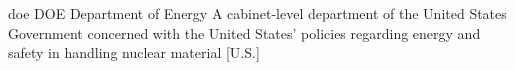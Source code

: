 \newglsXgovernment%
{doe}%
{DOE}%
{Department of Energy}%
{A cabinet-level department of the United States Government concerned with the United States' policies regarding energy and safety in handling nuclear material \cite{website:Department_of_Energy}}%
[U.S.]%